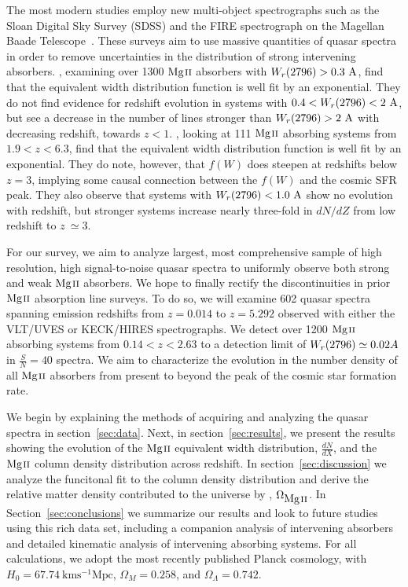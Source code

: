 \documentclass[iop,apj,numberedappendix,appendixfloats,twocolappendix]{emulateapj}
\begin{document}
The most modern studies employ new multi-object spectrographs such as the Sloan Digital Sky Survey (SDSS) and the FIRE spectrograph on the Magellan Baade Telescope~\citep{Nestor2005,Matejek2012}. These surveys aim to use massive quantities of quasar spectra in order to remove uncertainties in the distribution of strong intervening absorbers. \cite{Nestor2005}, examining over 1300 ${\hbox{{\rm Mg}\kern 0.1em{\sc ii}}}$ absorbers with $W_r(2796) > 0.3~\mathrm{\AA}$, find that the equivalent width distribution function is well fit by an exponential. They do not find evidence for redshift evolution in systems with $0.4 < W_r(2796) < 2~\mathrm{\AA}$, but see a decrease in the number of lines stronger than $W_r(2796) > 2~\mathrm{\AA}$ with decreasing redshift, towards $z < 1$. \cite{Matejek2012}, looking at 111 ${\hbox{{\rm Mg}\kern 0.1em{\sc ii}}}$ absorbing systems from $1.9 < z < 6.3$, find that the equivalent width distribution function is well fit by an exponential. They do note, however, that $f(W)$ does steepen at redshifts below $z = 3$, implying some causal connection between the $f(W)$ and the cosmic SFR peak. They also observe that systems with $W_r(2796) < 1.0~\mathrm{\AA}$ show no evolution with redshift, but stronger systems increase nearly three-fold in $dN\!/dZ$ from low redshift to $z~\simeq 3$. 

For our survey, we aim to analyze largest, most comprehensive sample of high resolution, high signal-to-noise quasar spectra to uniformly observe both strong and weak ${\hbox{{\rm Mg}\kern 0.1em{\sc ii}}}$ absorbers. We hope to finally rectify the discontinuities in prior ${\hbox{{\rm Mg}\kern 0.1em{\sc ii}}}$ absorption line surveys. To do so, we will examine 602 quasar spectra spanning emission redshifts from $z = 0.014$ to $z = 5.292$ observed with either the VLT/UVES or KECK/HIRES spectrographs. We detect over 1200 ${\hbox{{\rm Mg}\kern 0.1em{\sc ii}}}$ absorbing systems from $0.14 < z < 2.63$ to a detection limit of $W_r(2796) \simeq 0.02 {\AA}$ in $\frac{S}{N} = 40$ spectra. We aim to characterize the evolution in the number density of all ${\hbox{{\rm Mg}\kern 0.1em{\sc ii}}}$ absorbers from present to beyond the peak of the cosmic star formation rate.

We begin by explaining the methods of acquiring and analyzing the quasar spectra in section~\ref{sec:data}. Next, in section~\ref{sec:results}, we present the results showing the evolution of the ${\hbox{{\rm Mg}\kern 0.1em{\sc ii}}}$ equivalent width distribution, $\frac{dN}{dX}$, and the ${\hbox{{\rm Mg}\kern 0.1em{\sc ii}}}$ column density distribution across redshift. In section~\ref{sec:discussion} we analyze the funcitonal fit to the column density distribution and derive the relative matter density contributed to the universe by {\MgII}, $\Omega_{\hbox{{\rm Mg}\kern 0.1em{\sc ii}}}$. In Section~\ref{sec:conclusions} we summarize our results and look to future studies using this rich data set, including a companion analysis of intervening {\CIV} absorbers and detailed kinematic analysis of intervening absorbing systems. For all calculations, we adopt the most recently published Planck cosmology, with $H_0 = 67.74~\mathrm{km s^{-1} Mpc}$, $\Omega_M = 0.258$, and $\Omega_{\Lambda} = 0.742$.
\end{document}
